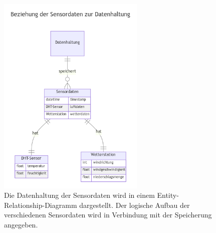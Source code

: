 \documentclass[
]{article}
\begin{document}
\begin{figure}[H]
	\centering
	\includegraphics[width=70mm]{resources/erDiagram-sensordaten-datenhaltung.png}
	\caption{Die Datenhaltung der Sensordaten wird in einem Entity-Relationship-Diagramm dargestellt. Der logische Aufbau der verschiedenen Sensordaten wird in Verbindung mit der Speicherung angegeben.}
	\label{fig:Datenhaltung}
\end{figure}  
\end{document}
